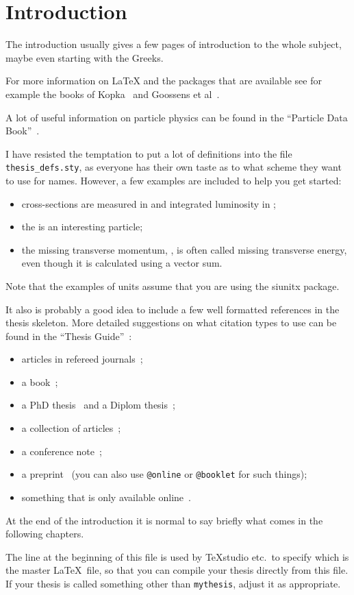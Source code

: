 \chapter{Introduction}
\label{sec:intro}

The introduction usually gives a few pages of introduction to the
whole subject, maybe even starting with the Greeks.

For more information on \LaTeX{} and the packages that are available
see for example the books of Kopka~\cite{kopka04} and Goossens et
al~\cite{goossens04}.

A lot of useful information on particle physics can be found in the
\enquote{Particle Data Book}~\cite{pdg2010}.

I have resisted the temptation to put a lot of definitions into the
file \texttt{thesis\_defs.sty}, as everyone has their own taste as
to what scheme they want to use for names.
However, a few examples are included to help you get started:
\begin{itemize}
\setlength{\itemsep}{0pt}\setlength{\parskip}{0pt}
\item cross-sections are measured in \si{\pb} and integrated
  luminosity in \si{\invpb};
\item the \KoS is an interesting particle;
\item the missing transverse momentum, \pTmiss, is often called
  missing transverse energy, even though it is calculated using a vector sum.
\end{itemize}
Note that the examples of units assume that you are using the
\textsf{siunitx} package.

It also is probably a good idea to include a few well formatted
references in the thesis skeleton. More detailed suggestions on what
citation types to use can be found in the \enquote{Thesis Guide}~\cite{thesis-guide}:
\begin{itemize}
\item articles in refereed journals~\cite{pdg2010,Aad:2010ey};
\item a book~\cite{Halzen:1984mc};
\item a PhD thesis~\cite{tlodd:2012} and a Diplom thesis~\cite{mergelmeyer:2011};
\item a collection of articles~\cite{lhc:vol1};
\item a conference note~\cite{ATLAS-CONF-2011-008};
\item a preprint~\cite{atlas:perf:2009} (you can also use
  \texttt{@online} or \texttt{@booklet} for such things);
\item something that is only available online~\cite{thesis-guide}.
\end{itemize}

At the end of the introduction it is normal to say briefly what comes
in the following chapters.

The line at the beginning of this file is used by TeXstudio etc.\ to
specify which is the master \LaTeX\ file, so that you can compile your thesis
directly from this file.
If your thesis is called something other than \texttt{mythesis}, adjust it as appropriate.
